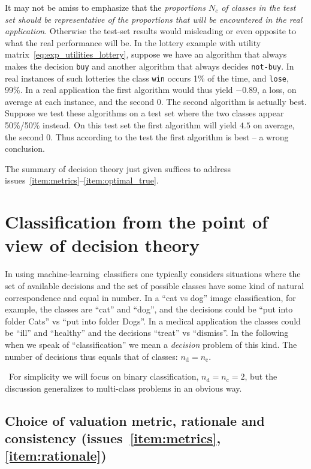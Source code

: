 \documentclass[\ifafour a4paper,12pt,\else a5paper,10pt,\fi%
onecolumn,oneside,article,%
british%
]{memoir}
\theoremstyle{remark}
\theoremstyle{innote}
\renewcommand*{\|}[1][]{\nonscript\:#1\vert\nonscript\:\mathopen{}}
\newcommand*{\puzzle}{{\fontencoding{U}\fontfamily{fontawesometwo}\selectfont\symbol{225}}}
\newcommand{\mynote}[1]{ {\color{notecolour}#1}}
\newcommand*{\ml}{machine-learning}
\newcommand*{\nd}{n_{\textrm{d}}}
\newcommand*{\nc}{n_{\textrm{c}}}
\begin{document}
It may not be amiss to emphasize that the \emph{proportions $N_{c}$ of classes in the test set should be representative of the proportions that will be encountered in the real application}. Otherwise the test-set results would misleading or even opposite to what the real performance will be. In the lottery example with utility matrix~\eqref{eq:exp_utilities_lottery}, suppose we have an algorithm that always makes the decision \texttt{buy} and another algorithm that always decides \texttt{not-buy}. In  real instances of such lotteries the class \texttt{win} occurs 1\% of the time, and \texttt{lose}, 99\%. In a real application the first algorithm would thus yield $-0.89$, a loss, on average at each instance, and the second $0$. The second algorithm is actually best. Suppose we test these algorithms on a test set where the two classes appear 50\%/50\% instead. On this test set the first algorithm will yield $4.5$ on average, the second $0$. Thus according to the test the first algorithm is best -- a wrong conclusion.

\bigskip

The summary of decision theory just given suffices to address issues~\ref{item:metrics}--\ref{item:optimal_true}.

\section{Classification from the point of view of decision theory}
\label{sec:classification_decision}

In using \ml\ classifiers one typically considers situations where the set of available decisions and the set of possible classes have some kind of natural correspondence and equal in number. In a \enquote{cat vs dog} image classification, for example, the classes are \enquote{cat} and \enquote{dog}, and the decisions could be \enquote{put into folder Cats} vs \enquote{put into folder Dogs}. In a medical application the classes could be \enquote{ill} and \enquote{healthy} and the decisions \enquote{treat} vs \enquote{dismiss}. In the following when we speak of \enquote{classification} we mean a \emph{decision} problem of this kind. The number of decisions thus equals that of classes: $\nd=\nc$.

\mynote{\puzzle\ For simplicity we will focus on binary classification, $\nd=\nc=2$, but the discussion generalizes to multi-class problems in an obvious way.}


\subsection{Choice of valuation metric, rationale and consistency (issues~\ref{item:metrics}, \ref{item:rationale})}
\label{sec:choice_valuation}
\end{document}
